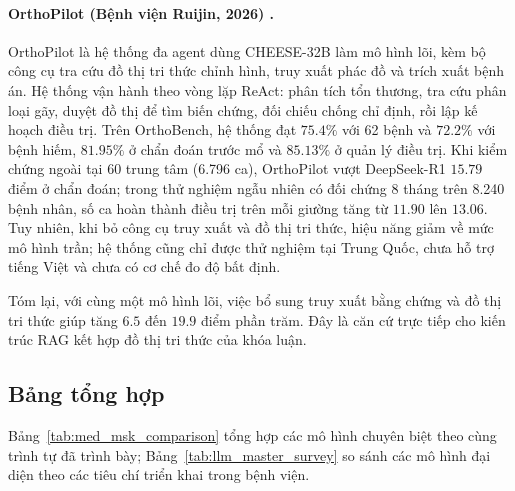 \paragraph{OrthoPilot (Bệnh viện Ruijin, 2026) \cite{orthopilot_2026}.}
OrthoPilot là hệ thống đa agent dùng CHEESE-32B làm mô hình lõi, kèm bộ công cụ tra cứu đồ thị tri thức chỉnh hình, truy xuất phác đồ và trích xuất bệnh án. Hệ thống vận hành theo vòng lặp ReAct: phân tích tổn thương, tra cứu phân loại gãy, duyệt đồ thị để tìm biến chứng, đối chiếu chống chỉ định, rồi lập kế hoạch điều trị. Trên OrthoBench, hệ thống đạt $75.4\%$ với 62 bệnh và $72.2\%$ với bệnh hiếm, $81.95\%$ ở chẩn đoán trước mổ và $85.13\%$ ở quản lý điều trị. Khi kiểm chứng ngoài tại 60 trung tâm (6.796 ca), OrthoPilot vượt DeepSeek-R1 $15.79$ điểm ở chẩn đoán; trong thử nghiệm ngẫu nhiên có đối chứng 8 tháng trên 8.240 bệnh nhân, số ca hoàn thành điều trị trên mỗi giường tăng từ $11.90$ lên $13.06$. Tuy nhiên, khi bỏ công cụ truy xuất và đồ thị tri thức, hiệu năng giảm về mức mô hình trần; hệ thống cũng chỉ được thử nghiệm tại Trung Quốc, chưa hỗ trợ tiếng Việt và chưa có cơ chế đo độ bất định.

Tóm lại, với cùng một mô hình lõi, việc bổ sung truy xuất bằng chứng và đồ thị tri thức giúp tăng $6.5$ đến $19.9$ điểm phần trăm. Đây là căn cứ trực tiếp cho kiến trúc RAG kết hợp đồ thị tri thức của khóa luận.

\subsection{Bảng tổng hợp}

Bảng~\ref{tab:med_msk_comparison} tổng hợp các mô hình chuyên biệt theo cùng trình tự đã trình bày; Bảng~\ref{tab:llm_master_survey} so sánh các mô hình đại diện theo các tiêu chí triển khai trong bệnh viện.

